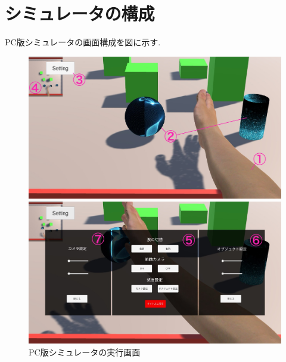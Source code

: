 \documentclass{ltjsreport}
\begin{document}
	\section{シミュレータの構成}
		PC版シミュレータの画面構成を図に示す.
		\begin{figure}[H]
		\centering
		\begin{minipage}{0.7\columnwidth}
		\centering
		\includegraphics[width = \columnwidth]{../figs/IMG_0341.JPG}
		\end{minipage}
		\hspace{0.04\columnwidth}
		\begin{minipage}{0.7\columnwidth}
		\centering
		\includegraphics[width = \columnwidth]{../figs/IMG_0342.JPG}
		\end{minipage}
		\caption{PC版シミュレータの実行画面}
		\label{fig:PCsimurate}
		\end{figure}
		\vspace{-15pt}
\end{document}
